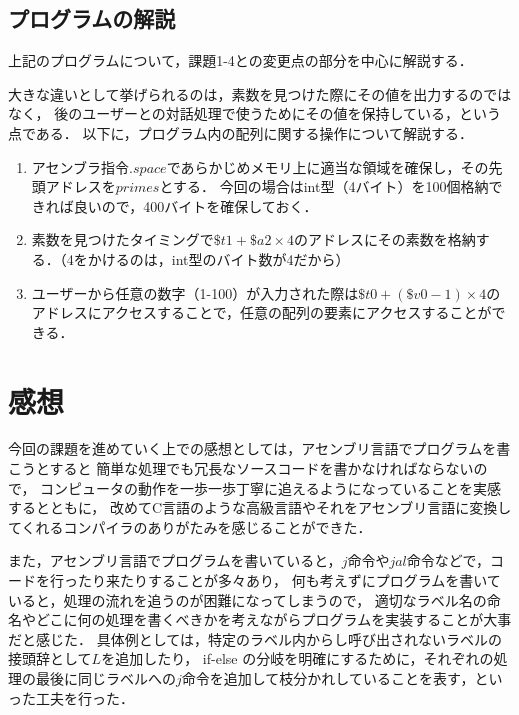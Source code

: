 \documentclass[a4j,11pt]{jarticle}
\begin{document}
\subsection{プログラムの解説}
上記のプログラムについて，課題1-4との変更点の部分を中心に解説する．

大きな違いとして挙げられるのは，素数を見つけた際にその値を出力するのではなく，
後のユーザーとの対話処理で使うためにその値を保持している，という点である．
以下に，プログラム内の配列に関する操作について解説する．

\begin{enumerate}
      \item アセンブラ指令$.space$であらかじめメモリ上に適当な領域を確保し，その先頭アドレスを$primes$とする．
      今回の場合はint型（4バイト）を100個格納できれば良いので，400バイトを確保しておく．
      \item 素数を見つけたタイミングで$\$t1 + \$a2 \times 4$のアドレスにその素数を格納する．（4をかけるのは，int型のバイト数が4だから）
      \item ユーザーから任意の数字（1-100）が入力された際は$\$t0 + (\$v0 - 1) \times 4$のアドレスにアクセスすることで，任意の配列の要素にアクセスすることができる．
\end{enumerate}


\section{感想}
今回の課題を進めていく上での感想としては，アセンブリ言語でプログラムを書こうとすると
簡単な処理でも冗長なソースコードを書かなければならないので，
コンピュータの動作を一歩一歩丁寧に追えるようになっていることを実感するとともに，
改めてC言語のような高級言語やそれをアセンブリ言語に変換してくれるコンパイラのありがたみを感じることができた．

また，アセンブリ言語でプログラムを書いていると，$j$命令や$jal$命令などで，コードを行ったり来たりすることが多々あり，
何も考えずにプログラムを書いていると，処理の流れを追うのが困難になってしまうので，
適切なラベル名の命名やどこに何の処理を書くべきかを考えながらプログラムを実装することが大事だと感じた．
具体例としては，特定のラベル内からし呼び出されないラベルの接頭辞として$L$を追加したり，
if-else の分岐を明確にするために，それぞれの処理の最後に同じラベルへの$j$命令を追加して枝分かれしていることを表す，といった工夫を行った．
\end{document}
